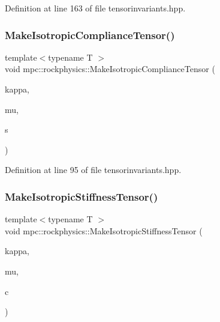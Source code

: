 Definition at line 163 of file tensorinvariants.\+hpp.

\mbox{\label{namespacempc_1_1rockphysics_a75a4220a2ac8369dca978b0538d69f8b}} 
\subsubsection{\texorpdfstring{Make\+Isotropic\+Compliance\+Tensor()}{MakeIsotropicComplianceTensor()}}
{\footnotesize\ttfamily template$<$typename T $>$ \\
void mpc\+::rockphysics\+::\+Make\+Isotropic\+Compliance\+Tensor (\begin{DoxyParamCaption}\item[{T}]{kappa,  }\item[{T}]{mu,  }\item[{\mbox{\hyperlink{structmpc_1_1core_1_1_compliance_tensor}{mpc\+::core\+::\+Compliance\+Tensor}}$<$ T $>$ \&}]{s }\end{DoxyParamCaption})}



Definition at line 95 of file tensorinvariants.\+hpp.

\mbox{\label{namespacempc_1_1rockphysics_acd5fe0ee3cac0cb810ca53c636186f59}} 
\subsubsection{\texorpdfstring{Make\+Isotropic\+Stiffness\+Tensor()}{MakeIsotropicStiffnessTensor()}}
{\footnotesize\ttfamily template$<$typename T $>$ \\
void mpc\+::rockphysics\+::\+Make\+Isotropic\+Stiffness\+Tensor (\begin{DoxyParamCaption}\item[{T}]{kappa,  }\item[{T}]{mu,  }\item[{\mbox{\hyperlink{structmpc_1_1core_1_1_stiffness_tensor}{mpc\+::core\+::\+Stiffness\+Tensor}}$<$ T $>$ \&}]{c }\end{DoxyParamCaption})}



